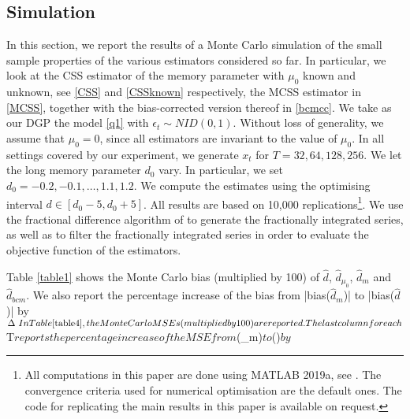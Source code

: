 {{\subsection{Simulation}\label{S4}

In this section, we report the results of a Monte Carlo simulation of the small sample properties of the various estimators considered so far. In particular, we look at the CSS estimator of the memory parameter with $\mu_0$ known
and unknown, see \eqref{CSS} and \eqref{CSSknown} respectively, the MCSS estimator in \eqref{MCSS}, together with the bias-corrected version thereof in \eqref{bcmcc}. We take as our DGP the model \eqref{q1} with
$\epsilon_t \sim \textit{NID}(0,1)$. Without loss of generality, we assume that $\mu_0 = 0$, since all estimators are invariant to the value of $\mu_0$. In all settings covered by our experiment, we generate $x_t$ for
$T = 32, 64, 128, 256$. We let the long memory parameter $d_0$ vary. In particular, we set $d_0 = -0.2,-0.1,\ldots, 1.1,1.2$. We compute the estimates using the optimising interval $d \in [d_0-5,d_0+5]$. All results are based on
10,000 replications\footnote{All computations in this paper are done using MATLAB 2019a, see \textcite{MATLAB}. The convergence criteria  used for numerical optimisation are the default ones. The code for replicating the main results in this paper is available on request. }. We use the fractional difference algorithm of \textcite{jensen2014fast} to generate the
fractionally integrated series, as well as to filter the fractionally integrated series in order to evaluate the objective function of the estimators.


Table \ref{table1} shows the Monte Carlo bias (multiplied by 100) of $\hat{d}$,  $\hat{d}_{\mu_0}$, $\hat{d}_{m}$ and $\hat{d}_{bcm}$. We also report the percentage increase of the bias from |bias($\hat{d}_{m}$)| to |bias($\hat{d}$)| by $\Delta \
In Table \ref{table4}, the Monte Carlo MSEs (multiplied by 100) are reported. The last column for each $T$ reports the percentage increase of the MSE from $(_{m})$ to $()$  by $\Delta \

}}
